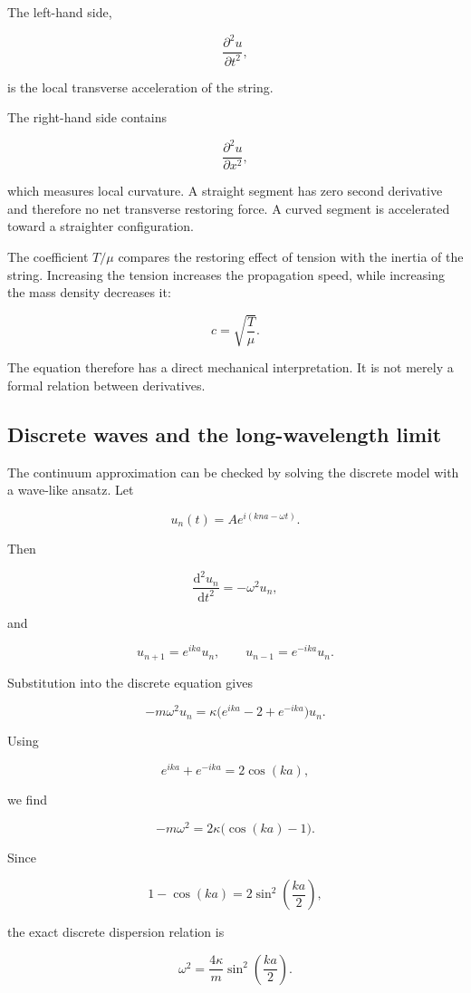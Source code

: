 The left-hand side,

\[
\frac{\partial^{2}u}{\partial t^{2}},
\]

is the local transverse acceleration of the string.

The right-hand side contains

\[
\frac{\partial^{2}u}{\partial x^{2}},
\]

which measures local curvature. A straight segment has zero second derivative and therefore no net transverse restoring force. A curved segment is accelerated toward a straighter configuration.

The coefficient \(T/\mu\) compares the restoring effect of tension with the inertia of the string. Increasing the tension increases the propagation speed, while increasing the mass density decreases it:

\[
c=\sqrt{\frac{T}{\mu}}.
\]

The equation therefore has a direct mechanical interpretation. It is not merely a formal relation between derivatives.

\subsection{Discrete waves and the long-wavelength limit}

The continuum approximation can be checked by solving the discrete model with a wave-like ansatz. Let

\[
u_{n}(t)
=
A e^{i(kna-\omega t)}.
\]

Then

\[
\frac{\mathrm{d}^{2}u_{n}}{\mathrm{d}t^{2}}
=
-\omega^{2}u_{n},
\]

and

\[
u_{n+1}=e^{ika}u_{n},
\qquad
u_{n-1}=e^{-ika}u_{n}.
\]

Substitution into the discrete equation gives

\[
-m\omega^{2}u_{n}
=
\kappa
\bigl(e^{ika}-2+e^{-ika}\bigr)u_{n}.
\]

Using

\[
e^{ika}+e^{-ika}=2\cos(ka),
\]

we find

\[
-m\omega^{2}
=
2\kappa\bigl(\cos(ka)-1\bigr).
\]

Since

\[
1-\cos(ka)
=
2\sin^{2}\left(\frac{ka}{2}\right),
\]

the exact discrete dispersion relation is

\[
\boxed{
\omega^{2}
=
\frac{4\kappa}{m}
\sin^{2}\left(\frac{ka}{2}\right)
}.
\]


